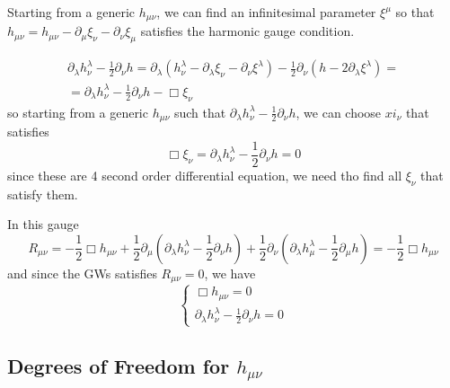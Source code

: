 Starting from a generic $h_{\mu \nu } $, we can find an infinitesimal parameter $\xi ^{\mu }$ so that $h_{\mu \nu } = h_{\mu \nu } - \partial_{\mu }\xi _{\nu }-\partial_{\nu }\xi _{\mu }$ satisfies the harmonic gauge condition.

\begin{gather*}
\partial_{\lambda }h^{\lambda }_{\nu } - \frac{1}{2}\partial_{\nu }h  = \partial_{\lambda }\left( h^{\lambda }_{\nu }-\partial_{\lambda }\xi_{\nu } - \partial_{\nu }\xi ^{\lambda }\right) - \frac{1}{2}\partial_{\nu }\left( h - 2\partial_{\lambda } \xi ^{\lambda } \right) =\\
= \partial_{\lambda }h^{\lambda }_{\nu } - \frac{1}{2}\partial_{\nu }h - \Box \xi _{\nu }
\end{gather*}
so starting from a generic $h_{\mu \nu }$ such that $\partial_{\lambda }h^{\lambda }_{\nu }- \frac{1}{2}\partial_{\nu }h$, we can choose $xi_{\nu }$ that satisfies 
\[
\Box \xi _{\nu } = \partial_{\lambda }h^{\lambda }_{\nu } - \frac{1}{2}\partial_{\nu }h =0
\]
since these are 4 second order differential equation, we need tho find all $\xi _{\nu }$ that satisfy them.

In this gauge
\begin{equation}
R_{\mu \nu } = -\frac{1}{2}\Box h_{\mu \nu } + \frac{1}{2} \partial_{\mu }\left( \partial_{\lambda }h^{\lambda }_{\nu }- \frac{1}{2}\partial_{\nu }h \right) + \frac{1}{2}\partial_{\nu }\left( \partial_{\lambda }h^{\lambda }_{\mu } - \frac{1}{2}\partial_{\mu }h \right) = - \frac{1}{2}\Box h_{\mu \nu }
\end{equation}
and since the GWs satisfies $R_{\mu \nu }=0$, we have
\begin{equation}
\begin{cases}
\Box h_{\mu \nu } = 0 \\
\partial_{\lambda }h^{\lambda }_{\nu }- \frac{1}{2}\partial_{\nu }h = 0 
\end{cases}
\end{equation}



\subsection{Degrees of Freedom for $h_{\mu \nu }$}

